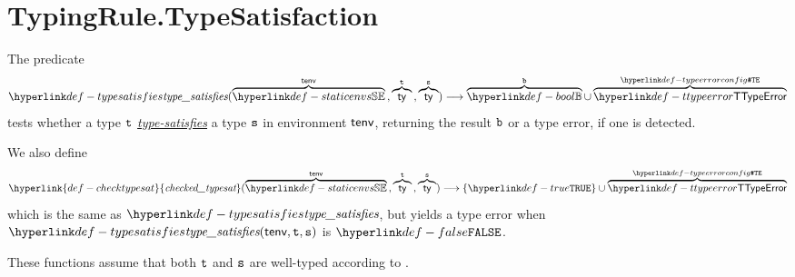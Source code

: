 \documentclass{book}
\newcommand\checktypesat[0]{\hyperlink{def-checktypesat}{\textfunc{checked\_typesat}}}
\newcommand\typesatisfies[0]{\hyperlink{def-typesatisfies}{type-satisfies}}
\begin{document}

\section{TypingRule.TypeSatisfaction \label{sec:TypingRule.TypeSatisfaction}}
\hypertarget{def-typesatisfies}{}
The predicate
\[
  \typesat(\overname{\staticenvs}{\tenv} \aslsep \overname{\ty}{\vt} \aslsep \overname{\ty}{\vs})
  \aslto \overname{\Bool}{\vb} \cup \overname{\TTypeError}{\TypeErrorConfig}
\]
tests whether a type $\texttt{t}$ \emph{\typesatisfies} a type $\texttt{s}$ in environment $\textsf{tenv}$,
returning the result $\texttt{b}$ or a type error, if one is detected.

\hypertarget{def-checktypesat}{}
We also define
\[
  \checktypesat(\overname{\staticenvs}{\tenv} \aslsep \overname{\ty}{\vt} \aslsep \overname{\ty}{\vs})
  \aslto \{\True\} \cup \overname{\TTypeError}{\TypeErrorConfig}
\]
which is the same as $\typesat$, but yields a type error when \\ $\typesat(\tenv, \vt, \vs)$ is $\False$.

These functions assume that both $\texttt{t}$ and $\texttt{s}$ are well-typed according to .
\end{document}
